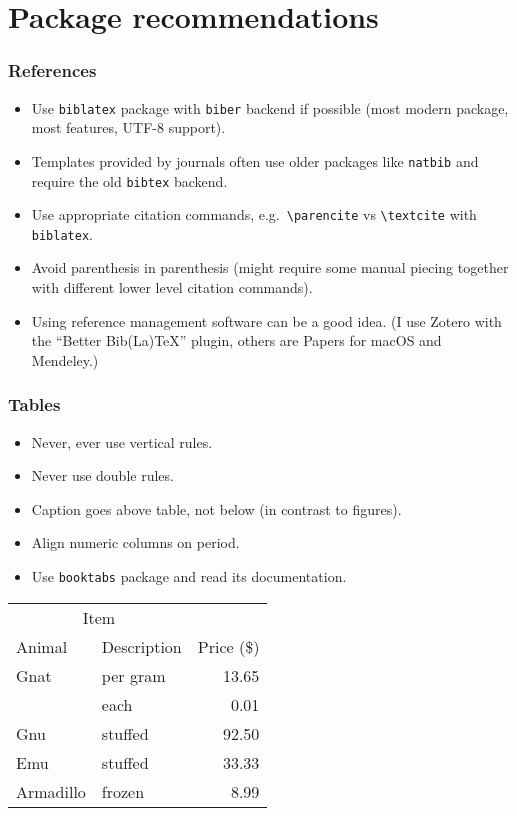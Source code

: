 \documentclass[aspectratio=1610,hyperref={colorlinks,linkcolor=}]{beamer}
\newcommand{\pkg}[1]{\texttt{#1}}
\begin{document}
\section{Package recommendations}
\begin{frame}[fragile]
    \frametitle{References}
    \begin{itemize}
        \item Use \pkg{biblatex} package with \pkg{biber} backend if possible (most modern package, most features, UTF-8 support).
        \item Templates provided by journals often use older packages like \pkg{natbib} and require the old \pkg{bibtex} backend.
        \item Use appropriate citation commands, e.g.~\verb+\parencite+ vs \verb+\textcite+ with \verb+biblatex+.
        \item Avoid parenthesis in parenthesis (might require some manual piecing together with different lower level citation commands).
        \item Using reference management software can be a good idea. (I use Zotero with the ``Better Bib(La)TeX'' plugin, others are Papers for macOS and Mendeley.)  %
    \end{itemize}
\end{frame}

\begin{frame}[fragile]
    \frametitle{Tables}
    \begin{itemize}
        \item Never, ever use vertical rules.
        \item Never use double rules.
        \item Caption goes above table, not below (in contrast to figures).
        \item Align numeric columns on period.
        \item Use \pkg{booktabs} package and read its documentation.
    \end{itemize}
    \begin{center}
        \begin{tabular}{@{}llr@{}} \toprule
            \multicolumn{2}{c}{Item} \\ \cmidrule(r){1-2}
            Animal & Description & Price (\$)\\ \midrule
            Gnat & per gram & 13.65 \\
            & each & 0.01 \\
            Gnu & stuffed & 92.50 \\
            Emu & stuffed & 33.33 \\
            Armadillo & frozen & 8.99 \\ \bottomrule
        \end{tabular}
    \end{center}
\end{frame}
\end{document}
